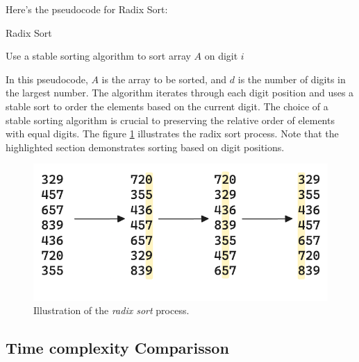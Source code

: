 \documentclass[a4paper,10pt]{article}
\newcommand{\hlti}[1]{\colorbox{color1}{#1}}
\begin{document}
Here's the pseudocode for Radix Sort:

\begin{algorithm}
    \caption{Radix Sort}
    \begin{algorithmic}[1]
                \State Use a \hlti{stable} sorting algorithm to sort array $A$ on digit $i$
            \EndFor
        \EndProcedure
    \end{algorithmic}
\end{algorithm}

In this pseudocode, $A$ is the array to be sorted, and $d$ is the number of digits in the largest number. The algorithm iterates through each digit position and uses a stable sort to order the elements based on the current digit. The choice of a stable sorting algorithm is crucial to preserving the relative order of elements with equal digits. The figure \ref{fig:radix_sort} illustrates the radix sort process. Note that the highlighted section demonstrates sorting based on digit positions.

\begin{figure}[ht]
\centering
\includegraphics[width=0.5\linewidth]{figures/radix_sort.png}
\caption{Illustration of the \textit{radix sort} process.}
\label{fig:radix_sort}
\end{figure}

\subsection{Time complexity Comparisson}
\end{document}
